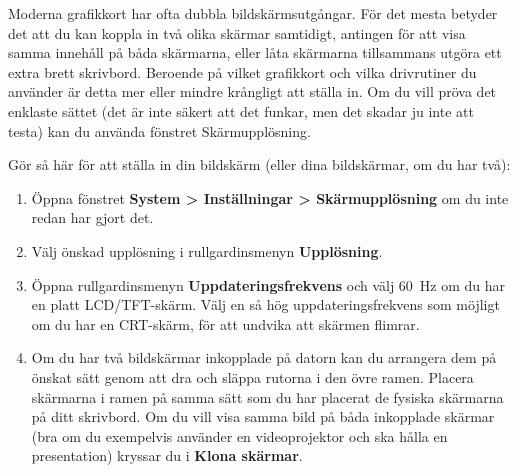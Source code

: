 \documentclass[a4paper,final]{memoir} %
\begin{document}
Moderna grafikkort har ofta dubbla bildskärmsutgångar. För det mesta betyder det att du kan koppla in två olika skärmar samtidigt, antingen för att visa samma innehåll på båda skärmarna, eller låta skärmarna tillsammans utgöra ett extra brett skrivbord. Beroende på vilket grafikkort och vilka drivrutiner du använder är detta mer eller mindre krångligt att ställa in. Om du vill pröva det enklaste sättet (det är inte säkert att det funkar, men det skadar ju inte att testa) kan du använda fönstret Skärmupplösning. 


Gör så här för att ställa in din bildskärm (eller dina bildskärmar, om du har två):

\begin{enumerate}

\item Öppna fönstret \textbf{System \textgreater{} Inställningar \textgreater{} Skärmupplösning} om du inte redan har gjort det.

\item Välj önskad upplösning i rullgardinsmenyn \textbf{Upplösning}.

\item Öppna rullgardinsmenyn \textbf{Uppdateringsfrekvens} och välj 60~Hz om du har en platt LCD/TFT-skärm. Välj en så hög uppdateringsfrekvens som möjligt om du har en CRT-skärm, för att undvika att skärmen flimrar.

\item Om du har två bildskärmar inkopplade på datorn kan du arrangera dem på önskat sätt genom att dra och släppa rutorna i den övre ramen. Placera skärmarna i ramen på samma sätt som du har placerat de fysiska skärmarna på ditt skrivbord. Om du vill visa samma bild på båda inkopplade skärmar (bra om du exempelvis använder en videoprojektor och ska hålla en presentation) kryssar du i \textbf{Klona skärmar}.

\end{enumerate}


\end{document}
